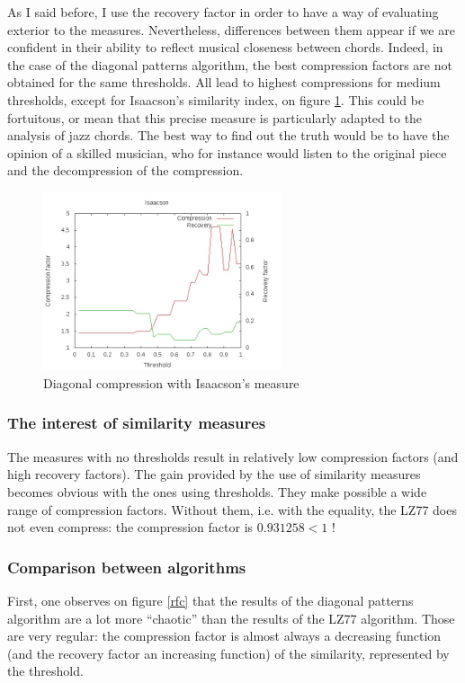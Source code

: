 \documentclass[a4paper,10pt]{article}
\newcommand{\guill}[1]{``#1''}
\begin{document}
As I said before, I use the recovery factor in order to have a way of evaluating exterior to the measures. Nevertheless, differences between them appear if we are confident in their ability to reflect musical closeness between chords. Indeed, in the case of the diagonal patterns algorithm, the best compression factors are not obtained for the same thresholds. All lead to highest compressions for medium thresholds, except for Isaacson's similarity index, on figure \ref{isaacson}. This could be fortuitous, or mean that this precise measure is particularly adapted to the analysis of jazz chords. The best way to find out the truth would be to have the opinion of a skilled musician, who for instance would listen to the original piece and the decompression of the compression.

\begin{figure}[h]
\centering
\includegraphics[width=7cm]{images/IsaacsonDiag.jpg}
\caption{Diagonal compression with Isaacson's measure\label{isaacson}}
\end{figure}

\subsubsection*{The interest of similarity measures}

The measures with no thresholds result in relatively low compression factors (and high recovery factors). The gain provided by the use of similarity measures becomes obvious with the ones using thresholds. They make possible a wide range of compression factors. Without them, i.\!e. with the equality, the LZ77 does not even compress: the compression factor is $0.931258<1$ !


\subsubsection*{Comparison between algorithms}

First, one observes on figure \ref{rfc} that the results of the diagonal patterns algorithm are a lot more \guill{chaotic} than the results of the LZ77 algorithm. Those are very regular: the compression factor is almost always a decreasing function (and the recovery factor an increasing function) of the similarity, represented by the threshold.
\end{document}
